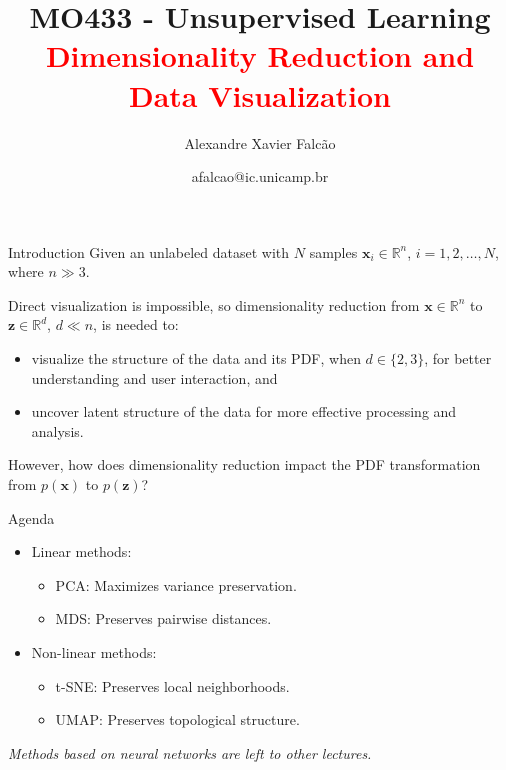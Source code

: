 \documentclass{beamer}
\title[MO433 - Unsupervised Learning]{MO433 - Unsupervised Learning \\ \textcolor{red}{Dimensionality Reduction and Data Visualization}}
\author{Alexandre Xavier Falc{\~{a}}o}
\institute[IC-UNICAMP]{Institute of Computing - UNICAMP}
\date{afalcao@ic.unicamp.br}
\begin{document}
\begin{frame}
\titlepage
\end{frame}

\begin{frame}{Introduction}
Given an unlabeled dataset with $N$ samples $\mathbf{x}_i\in
\mathbb{R}^n$, $i=1,2,\ldots,N$, where $n \gg 3$.

\vspace{0.7cm}

Direct visualization is impossible, so dimensionality reduction from
$\mathbf{x}\in \mathbb{R}^n$ to $\mathbf{z}\in \mathbb{R}^d$, $d\ll
n$, is needed to:

\vspace{0.5cm}

\begin{itemize}
  \item visualize the structure of the data and its PDF, when $d\in \{2,3\}$, for better understanding and user interaction, and
\vspace{0.5cm}
  \item uncover latent structure of the data for more effective
    processing and analysis.
\end{itemize}

\pause \vspace{0.5cm}
\alert{However, how does dimensionality reduction impact the PDF transformation from $p(\mathbf{x})$ to $p(\mathbf{z})$?}

\end{frame}

\begin{frame}{Agenda}
  \begin{itemize}
  \item Linear methods:
    \vspace{0.5cm}
    \begin{itemize}
    \item \alert{PCA:} Maximizes variance preservation.
      \vspace{0.3cm}
    \item \alert{MDS:} Preserves pairwise distances.
    \end{itemize}
    \vspace{0.5cm}
  \item Non-linear methods:
    \vspace{0.5cm}
    \begin{itemize}
    \item \alert{t-SNE:} Preserves local neighborhoods.
      \vspace{0.3cm}
    \item \alert{UMAP:} Preserves topological structure.
    \end{itemize}
  \end{itemize}
  \pause  \vspace{0.5cm}
  \textit{Methods based on neural networks are left to other lectures.}
\end{frame}
\end{document}
